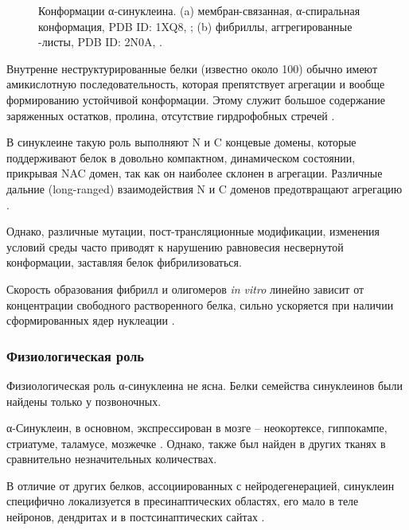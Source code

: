 \begin{figure}[h]
\begin{subfigure}[t]{0.6\textwidth}
	\end{subfigure}
	\caption{Конформации α-синуклеина.   
		(a) мембран-связанная, α-спиральная конформация, PDB ID: 1XQ8, \cite{ulmer_structure_2005};
		(b) фибриллы, аггрегированные \textbeta-листы, PDB ID: 2N0A, \cite{tuttle_solid-state_2016}.
		}
	\label{fig:structs}
	
\end{figure}

Внутренне неструктурированные белки (известно около 100) обычно имеют амикислотную последовательность, которая препятствует агрегации и вообще формированию устойчивой конформации. Этому служит большое содержание заряженных остатков, пролина, отсутствие гирдрофобных стречей \cite{radivojac_intrinsic_2007}. 

В синуклеине такую роль выполняют N и C концевые домены, которые поддерживают белок в довольно компактном, динамическом состоянии, прикрывая NAC домен, так как он наиболее склонен в агрегации. Различные дальние (long-ranged) взаимодействия N и C доменов предотвращают агрегацию \cite{bertoncini_release_2005}.

Однако, различные мутации, пост-трансляционные модификации, изменения условий среды часто приводят к нарушению равновесия несвернутой конформации, заставляя белок фибрилизоваться.

Скорость образования фибрилл и олигомеров \textit{in vitro} линейно зависит от концентрации свободного растворенного белка, сильно ускоряется при наличии сформированных ядер нуклеации \cite{wood_-synuclein_1999}.





\subsubsection{Физиологическая роль}

Физиологическая роль α-синуклеина не ясна. Белки семейства синуклеинов были найдены только у позвоночных. 

α-Синуклеин, в основном, экспрессирован в мозге \cite{jakes_identification_1994} -- неокортексе, гиппокампе, стриатуме, таламусе, мозжечке \cite{iwai_precursor_1995}. Однако, также был найден в других тканях в сравнительно незначительных количествах. 

В отличие от других белков, ассоциированных с нейродегенерацией, синуклеин специфично локализуется в пресинаптических областях, его мало в теле нейронов, дендритах и в постсинаптических сайтах \cite{george_characterization_1995, iwai_precursor_1995}. 

